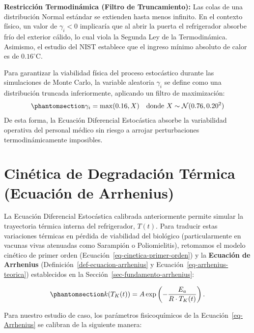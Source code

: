 \documentclass[
  spanish,
  us-letterpaper,
]{scrreprt}
\numberwithin{equation}{section}
\theoremstyle{plain}
\theoremstyle{plain}
\theoremstyle{plain}
\theoremstyle{definition}
\theoremstyle{remark}
\begin{document}
\textbf{Restricción Termodinámica (Filtro de Truncamiento):} Las colas
de una distribución Normal estándar se extienden hasta menos infinito.
En el contexto físico, un valor de \(\gamma_i < 0\) implicaría que al
abrir la puerta el refrigerador absorbe frío del exterior cálido, lo
cual viola la Segunda Ley de la Termodinámica. Asimismo, el estudio del
NIST establece que el ingreso mínimo absoluto de calor es de
\(0.16^\circ\text{C}\).

Para garantizar la viabilidad física del proceso estocástico durante las
simulaciones de Monte Carlo, la variable aleatoria \(\gamma_i\) se
define como una distribución truncada inferiormente, aplicando un filtro
de maximización:
\begin{equation}\phantomsection\label{eq-salto-termico}{\gamma_i = \max(0.16, X) \quad \text{donde } X \sim \mathcal{N}(0.76, 0.20^2)}\end{equation}
De esta forma, la Ecuación Diferencial Estocástica absorbe la
variabilidad operativa del personal médico sin riesgo a arrojar
perturbaciones termodinámicamente imposibles.

\section{Cinética de Degradación Térmica (Ecuación de
Arrhenius)}\label{sec-Arrhenius}

La Ecuación Diferencial Estocástica calibrada anteriormente permite
simular la trayectoria térmica interna del refrigerador, \(T(t)\). Para
traducir estas variaciones térmicas en pérdida de viabilidad del
biológico (particularmente en vacunas vivas atenuadas como Sarampión o
Poliomielitis), retomamos el modelo cinético de primer orden
(Ecuación~\ref{eq-cinetica-primer-orden}) y la \textbf{Ecuación de
Arrhenius} (Definición~\ref{def-ecuacion-arrhenius} y
Ecuación~\ref{eq-arrhenius-teorica}) establecidos en la
Sección~\ref{sec-fundamento-arrhenius}:

\begin{equation}\phantomsection\label{eq-Arrhenius}{
k(T_K(t)) = A \exp\left(-\frac{E_a}{R \cdot T_K(t)}\right).
}\end{equation}

Para nuestro estudio de caso, los parámetros fisicoquímicos de la
Ecuación~\ref{eq-Arrhenius} se calibran de la siguiente manera:
\end{document}
